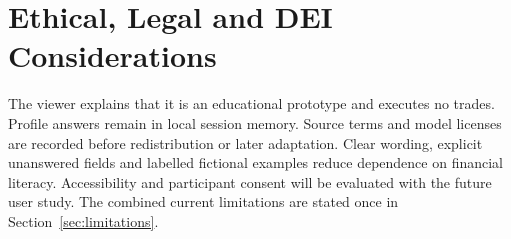 \section{Ethical, Legal and DEI Considerations}
The viewer explains that it is an educational prototype and executes no trades. Profile answers remain in local session memory. Source terms and model licenses are recorded before redistribution or later adaptation. Clear wording, explicit unanswered fields and labelled fictional examples reduce dependence on financial literacy. Accessibility and participant consent will be evaluated with the future user study. The combined current limitations are stated once in Section~\ref{sec:limitations}.
